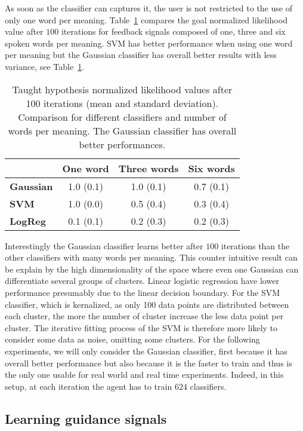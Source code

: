 As soon as the classifier can captures it, the user is not restricted to the use of only one word per meaning. Table~\ref{tab:1} compares the goal normalized likelihood value after $100$ iterations for feedback signals composed of one, three and six spoken words per meaning. SVM has better performance when using one word per meaning but the Gaussian classifier has overall better results with less variance, see Table~\ref{tab:1}. 

\begin{table}[!ht]
\centering
\begin{tabular}{|l|c|c|c|}
\hline
&\textbf{One word}&\textbf{Three words}&\textbf{Six words}\\\hline
\textbf{Gaussian}&1.0 (0.1)&1.0 (0.1)&0.7 (0.1)\\\hline
\textbf{SVM}&1.0 (0.0)&0.5 (0.4)&0.3 (0.4)\\\hline
\textbf{LogReg}&0.1 (0.1)&0.2 (0.3)&0.2 (0.3)\\\hline
\end{tabular}
\caption{Taught hypothesis normalized likelihood values after 100 iterations (mean and standard deviation). Comparison for different classifiers and number of words per meaning. The Gaussian classifier has overall better performances.}
\label{tab:1}
\end{table}

Interestingly the Gaussian classifier learns better after $100$ iterations than the other classifiers with many words per meaning. This counter intuitive result can be explain by the high dimensionality of the space where even one Gaussian can differentiate several groups of clusters. Linear logistic regression have lower performance presumably due to the linear decision boundary. For the SVM classifier, which is kernalized, as only 100 data points are distributed between each cluster, the more the number of cluster increase the less data point per cluster. The iterative fitting process of the SVM is therefore more likely to consider some data as noise, omitting some clusters. For the following experiments, we will only consider the Gaussian classifier, first because it has overall better performance but also because it is the faster to train and thus is the only one usable for real world and real time experiments. Indeed, in this setup, at each iteration the agent has to train $624$ classifiers.

\subsection{Learning guidance signals}

